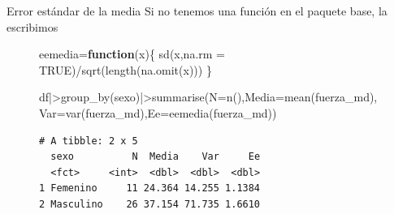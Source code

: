 \documentclass[
  ignorenonframetext,
]{beamer}
\newenvironment{Shaded}{\begin{snugshade}}{\end{snugshade}}
\newcommand{\AttributeTok}[1]{\textcolor[rgb]{0.40,0.45,0.13}{#1}}
\newcommand{\ConstantTok}[1]{\textcolor[rgb]{0.56,0.35,0.01}{#1}}
\newcommand{\ControlFlowTok}[1]{\textcolor[rgb]{0.00,0.23,0.31}{\textbf{#1}}}
\newcommand{\FunctionTok}[1]{\textcolor[rgb]{0.28,0.35,0.67}{#1}}
\newcommand{\NormalTok}[1]{\textcolor[rgb]{0.00,0.23,0.31}{#1}}
\newcommand{\OtherTok}[1]{\textcolor[rgb]{0.00,0.23,0.31}{#1}}
\newcommand{\SpecialCharTok}[1]{\textcolor[rgb]{0.37,0.37,0.37}{#1}}
\begin{document}
\begin{frame}[fragile]{Error estándar de la media}
\label{error-estuxe1ndar-de-la-media}
Si no tenemos una función en el paquete base, la escribimos

\begin{figure}

\begin{Shaded}
\begin{Highlighting}[]
\NormalTok{eemedia}\OtherTok{=}\ControlFlowTok{function}\NormalTok{(x)\{}
  \FunctionTok{sd}\NormalTok{(x,}\AttributeTok{na.rm =} \ConstantTok{TRUE}\NormalTok{)}\SpecialCharTok{/}\FunctionTok{sqrt}\NormalTok{(}\FunctionTok{length}\NormalTok{(}\FunctionTok{na.omit}\NormalTok{(x))) }
\NormalTok{\}}
\end{Highlighting}
\end{Shaded}

\end{figure}%

\begin{figure}

\begin{Shaded}
\begin{Highlighting}[]
\NormalTok{df}\SpecialCharTok{|\textgreater{}}\FunctionTok{group\_by}\NormalTok{(sexo)}\SpecialCharTok{|\textgreater{}}\FunctionTok{summarise}\NormalTok{(}\AttributeTok{N=}\FunctionTok{n}\NormalTok{(),}\AttributeTok{Media=}\FunctionTok{mean}\NormalTok{(fuerza\_md),}\AttributeTok{Var=}\FunctionTok{var}\NormalTok{(fuerza\_md),}\AttributeTok{Ee=}\FunctionTok{eemedia}\NormalTok{(fuerza\_md))  }
\end{Highlighting}
\end{Shaded}

\begin{verbatim}
# A tibble: 2 x 5
  sexo          N  Media    Var     Ee
  <fct>     <int>  <dbl>  <dbl>  <dbl>
1 Femenino     11 24.364 14.255 1.1384
2 Masculino    26 37.154 71.735 1.6610
\end{verbatim}

\end{figure}%
\end{frame}
\end{document}
